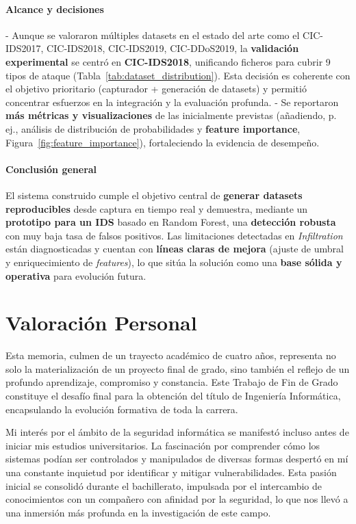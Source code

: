 \paragraph{Alcance y decisiones}
- Aunque se valoraron múltiples datasets en el estado del arte como el CIC-IDS2017, CIC‑IDS2018, CIC‑IDS2019, CIC-DDoS2019, la \textbf{validación experimental} se centró en \textbf{CIC-IDS2018}, unificando ficheros para cubrir 9 tipos de ataque (Tabla~\ref{tab:dataset_distribution}). Esta decisión es coherente con el objetivo prioritario (capturador + generación de datasets) y permitió concentrar esfuerzos en la integración y la evaluación profunda.
- Se reportaron \textbf{más métricas y visualizaciones} de las inicialmente previstas (añadiendo, p.\,ej., análisis de distribución de probabilidades y \textbf{feature importance}, Figura~\ref{fig:feature_importance}), fortaleciendo la evidencia de desempeño.

\paragraph{Conclusión general}
El sistema construido cumple el objetivo central de \textbf{generar datasets reproducibles} desde captura en tiempo real y demuestra, mediante un \textbf{prototipo para un IDS} basado en Random Forest, una \textbf{detección robusta} con muy baja tasa de falsos positivos. Las limitaciones detectadas en \textit{Infiltration} están diagnosticadas y cuentan con \textbf{líneas claras de mejora} (ajuste de umbral y enriquecimiento de \emph{features}), lo que sitúa la solución como una \textbf{base sólida y operativa} para evolución futura.

\section{Valoración Personal}
Esta memoria, culmen de un trayecto académico de cuatro años, representa no solo la materialización de un proyecto final de grado, sino también el reflejo de un profundo aprendizaje, compromiso y constancia. Este Trabajo de Fin de Grado constituye el desafío final para la obtención del título de Ingeniería Informática, encapsulando la evolución formativa de toda la carrera.

Mi interés por el ámbito de la seguridad informática se manifestó incluso antes de iniciar mis estudios universitarios. La fascinación por comprender cómo los sistemas podían ser controlados y manipulados de diversas formas despertó en mí una constante inquietud por identificar y mitigar vulnerabilidades. Esta pasión inicial se consolidó durante el bachillerato, impulsada por el intercambio de conocimientos con un compañero con afinidad por la seguridad, lo que nos llevó a una inmersión más profunda en la investigación de este campo.

